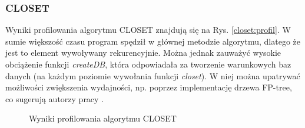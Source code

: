 \subsubsection{CLOSET}

Wyniki profilowania algorytmu CLOSET znajdują się na Rys. \ref{closet:profil}.
W sumie większość czasu program spędził w głównej metodzie algorytmu, dlatego że jest to element wywoływany rekurencyjnie.
Można jednak zauważyć wysokie obciążenie funkcji \textit{createDB}, która odpowiadała za tworzenie warunkowych baz danych (na każdym poziomie wywołania funkcji \textit{closet}).
W niej można upatrywać możliwości zwiększenia wydajności, np. poprzez implementację drzewa FP-tree, co sugerują autorzy pracy \cite{closetArt}.

\begin{figure}
\caption{Wyniki profilowania algorytmu CLOSET}

\end{figure}
